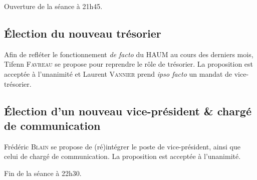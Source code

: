 \documentclass[a4paper, 11pt]{article}
\begin{document}
	\bigskip

	Ouverture de la séance à 21h45.

	\bigskip

	\subsection{Élection du nouveau trésorier}

    Afin de refléter le fonctionnement \textit{de facto} du HAUM au 
cours des derniers mois, Tifenn \textsc{Favreau} se propose pour 
reprendre le rôle de trésorier. La proposition est acceptée à 
l'unanimité et Laurent \textsc{Vannier} prend \textit{ipso facto} un 
mandat de vice-trésorier.
    
	\subsection{Élection d'un nouveau vice-président \& chargé de 
communication}
	
    Frédéric \textsc{Blain} se propose de (ré)intégrer le poste de 
vice-président, ainsi que celui de chargé de communication. La 
proposition est acceptée à l'unanimité.

	\bigskip

	Fin de la séance à 22h30.

	\bigskip
\end{document}
